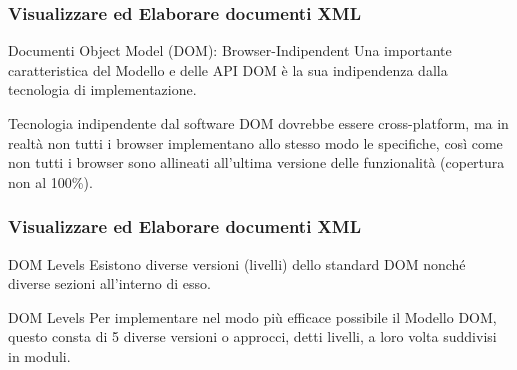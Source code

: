 \begin{frame}
    \frametitle{Visualizzare ed Elaborare documenti XML}
    \addtocounter{nframe}{1}
    

     \begin{block}{Documenti Object Model (DOM): Browser-Indipendent}
        Una importante caratteristica del Modello e delle API DOM è la sua indipendenza dalla tecnologia di implementazione.
        
     \end{block}

     \begin{block}{Tecnologia indipendente dal software}
        DOM dovrebbe essere cross-platform, ma in realtà non tutti i browser implementano allo stesso modo le specifiche, così come non tutti i browser sono allineati all'ultima versione delle funzionalità (copertura non al 100\%).
       
     \end{block}
     
\end{frame}


\begin{frame}
    \frametitle{Visualizzare ed Elaborare documenti XML}
    \addtocounter{nframe}{1}
    

     \begin{block}{DOM Levels}
       Esistono diverse versioni (livelli) dello standard DOM nonché diverse sezioni all'interno di esso.
     \end{block}

     \begin{block}{DOM Levels}
       Per implementare nel modo più efficace possibile il Modello DOM, questo consta di 5 diverse versioni o approcci, detti livelli, a loro volta suddivisi in moduli.
     \end{block}
     
\end{frame}

